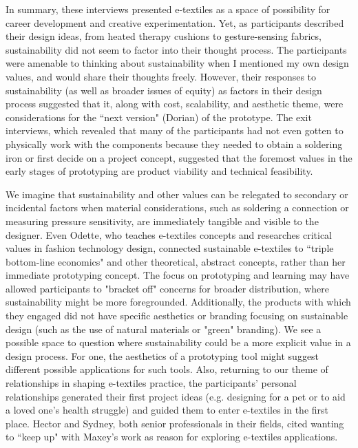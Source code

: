 In summary, these interviews presented e-textiles as a space of possibility for career development and creative experimentation. Yet, as participants described their design ideas, from heated therapy cushions to gesture-sensing fabrics, sustainability did not seem to factor into their thought process. The participants were amenable to thinking about sustainability when I mentioned my own design values, and would share their thoughts freely. However, their responses to sustainability (as well as broader issues of equity) as factors in their design process suggested that it, along with cost, scalability, and aesthetic theme, were considerations for the ``next version" (Dorian) of the prototype. The exit interviews, which revealed that many of the participants had not even gotten to physically work with the components because they needed to obtain a soldering iron or first decide on a project concept, suggested that the foremost values in the early stages of prototyping are product viability and technical feasibility. 

We imagine that sustainability and other values can be relegated to secondary or incidental factors when material considerations, such as soldering a connection or measuring pressure sensitivity, are immediately tangible and visible to the designer. Even Odette, who teaches e-textiles concepts and researches critical values in fashion technology design, connected sustainable e-textiles to ``triple bottom-line economics" and other theoretical, abstract concepts, rather than her immediate prototyping concept. The focus on prototyping and learning may have allowed participants to "bracket off" concerns for broader distribution, where sustainability might be more foregrounded. Additionally, the products with which they engaged did not have specific aesthetics or branding focusing on sustainable design (such as the use of natural materials or "green" branding). We see a possible space to question where sustainability could be a more explicit value in a design process. For one, the aesthetics of a prototyping tool might suggest different possible applications for such tools. Also, returning to our theme of relationships in shaping e-textiles practice, the participants' personal relationships generated their first project ideas (e.g. designing for a pet or to aid a loved one's health struggle) and guided them to enter e-textiles in the first place. Hector and Sydney, both senior professionals in their fields, cited wanting to ``keep up" with Maxey's work as reason for exploring e-textiles applications.

